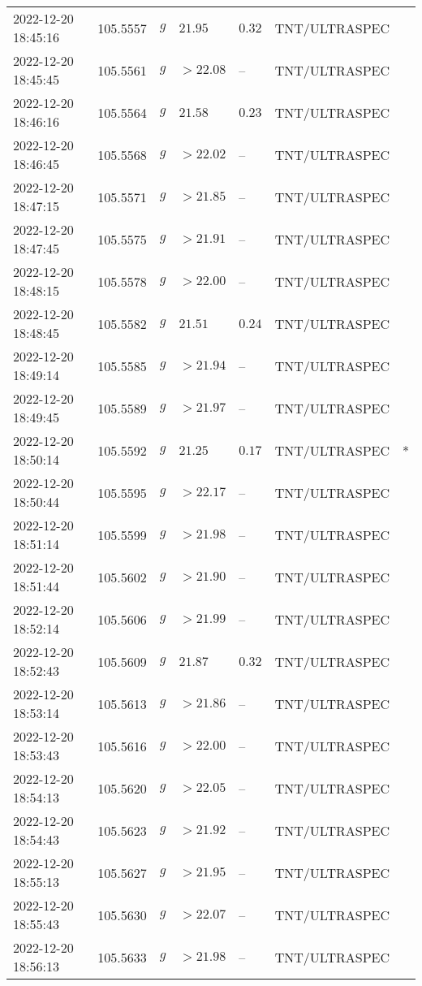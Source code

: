 \documentclass{nature_plusfigure}
\begin{document}
\begin{supplement}
\begin{center}
\begin{longtable}{lllllll}
2022-12-20 18:45:16 & 105.5557 & $g$ & $21.95$ & $0.32$ & TNT/ULTRASPEC &  \\ 
2022-12-20 18:45:45 & 105.5561 & $g$ & $>22.08$ & -- & TNT/ULTRASPEC &  \\ 
2022-12-20 18:46:16 & 105.5564 & $g$ & $21.58$ & $0.23$ & TNT/ULTRASPEC &  \\ 
2022-12-20 18:46:45 & 105.5568 & $g$ & $>22.02$ & -- & TNT/ULTRASPEC &  \\ 
2022-12-20 18:47:15 & 105.5571 & $g$ & $>21.85$ & -- & TNT/ULTRASPEC &  \\ 
2022-12-20 18:47:45 & 105.5575 & $g$ & $>21.91$ & -- & TNT/ULTRASPEC &  \\ 
2022-12-20 18:48:15 & 105.5578 & $g$ & $>22.00$ & -- & TNT/ULTRASPEC &  \\ 
2022-12-20 18:48:45 & 105.5582 & $g$ & $21.51$ & $0.24$ & TNT/ULTRASPEC &  \\ 
2022-12-20 18:49:14 & 105.5585 & $g$ & $>21.94$ & -- & TNT/ULTRASPEC &  \\ 
2022-12-20 18:49:45 & 105.5589 & $g$ & $>21.97$ & -- & TNT/ULTRASPEC &  \\ 
2022-12-20 18:50:14 & 105.5592 & $g$ & $21.25$ & $0.17$ & TNT/ULTRASPEC & * \\ 
2022-12-20 18:50:44 & 105.5595 & $g$ & $>22.17$ & -- & TNT/ULTRASPEC &  \\ 
2022-12-20 18:51:14 & 105.5599 & $g$ & $>21.98$ & -- & TNT/ULTRASPEC &  \\ 
2022-12-20 18:51:44 & 105.5602 & $g$ & $>21.90$ & -- & TNT/ULTRASPEC &  \\ 
2022-12-20 18:52:14 & 105.5606 & $g$ & $>21.99$ & -- & TNT/ULTRASPEC &  \\ 
2022-12-20 18:52:43 & 105.5609 & $g$ & $21.87$ & $0.32$ & TNT/ULTRASPEC &  \\ 
2022-12-20 18:53:14 & 105.5613 & $g$ & $>21.86$ & -- & TNT/ULTRASPEC &  \\ 
2022-12-20 18:53:43 & 105.5616 & $g$ & $>22.00$ & -- & TNT/ULTRASPEC &  \\ 
2022-12-20 18:54:13 & 105.5620 & $g$ & $>22.05$ & -- & TNT/ULTRASPEC &  \\ 
2022-12-20 18:54:43 & 105.5623 & $g$ & $>21.92$ & -- & TNT/ULTRASPEC &  \\ 
2022-12-20 18:55:13 & 105.5627 & $g$ & $>21.95$ & -- & TNT/ULTRASPEC &  \\ 
2022-12-20 18:55:43 & 105.5630 & $g$ & $>22.07$ & -- & TNT/ULTRASPEC &  \\ 
2022-12-20 18:56:13 & 105.5633 & $g$ & $>21.98$ & -- & TNT/ULTRASPEC &  \\ 

\end{longtable}
\end{center}
\end{supplement}
\end{document}
